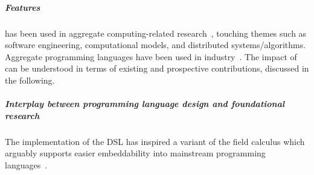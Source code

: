 \subparagraph{Features}
\label{s:impact}
\scafi{}
 has been used 
 in aggregate computing-related research~\cite{DBLP:journals/eaai/CasadeiVAPD21,audrito2022ecoop-xc,DBLP:conf/coordination/AguzziCV22,
 DBLP:conf/fmec/CasadeiV19,DBLP:conf/IEEEscc/CasadeiTVD19,DBLP:journals/scp/CasadeiAV18,DBLP:journals/jsan/CasadeiAV21,DBLP:conf/coordination/CasadeiVRA21,casadei2022applsci,arxiv2020scafi-nc},
  touching themes such as 
  software engineering, 
  computational models, and
  distributed systems/algorithms.
%
Aggregate programming languages 
 have been used in industry~\cite{DBLP:conf/saso/PaulosDBMHBPSSS19,DBLP:journals/taas/BealULRM18}.
%
The impact of \scafi{}
 can be understood in terms of 
 existing and prospective contributions, 
 discussed in the following.

\subparagraph*{Interplay between programming language design and foundational research} 
%
The implementation of the \scafi{} DSL
 has inspired a variant of the field calculus
 which arguably supports easier embeddability
 into mainstream programming languages~\cite{DBLP:conf/isola/CasadeiVAD20,arxiv2020scafi-nc}.

